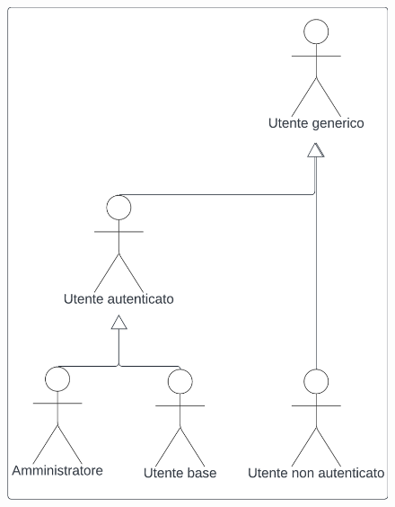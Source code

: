 \documentclass[12pt, oneside]{article}
\begin{document}
\begin{figure}[H]
\centering
\includegraphics[width=0.5\linewidth]{Attori_coinvolti.png}
\end{figure}
\newpage



%

%

%

\newpage




%

%

%










\end{document}
